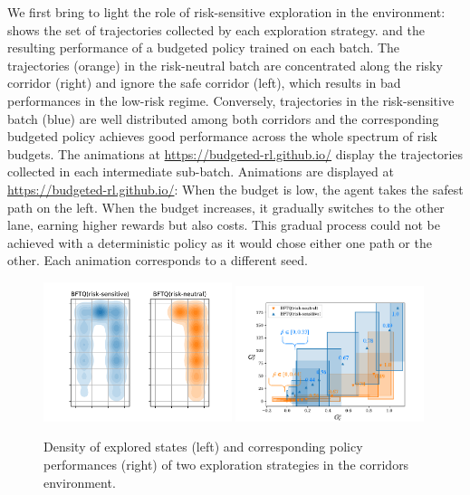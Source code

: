 We first bring to light the role of risk-sensitive exploration in the  environment:  shows the set of trajectories collected by each exploration strategy.
and the resulting performance of a budgeted policy trained on each batch. The trajectories (orange) in the risk-neutral batch are concentrated along the risky corridor (right) and ignore the safe corridor (left), which results in bad performances in the low-risk regime. Conversely, trajectories in the risk-sensitive batch (blue) are well distributed among both corridors and the corresponding budgeted policy achieves good performance across the whole spectrum of risk budgets. 
The animations at  \href{https://budgeted-rl.github.io/\#risk-sensitive-exploration}{https://budgeted-rl.github.io/} display the trajectories collected in each intermediate sub-batch.
Animations are displayed at  \href{https://budgeted-rl.github.io/\#optimal-budgeted-policies-learnt-with-a-risk-sensitive-exploration}{https://budgeted-rl.github.io/}: When the budget is low, the agent takes the safest path on the left. When the budget increases, it gradually switches to the other lane, earning higher rewards but also costs. This gradual process could not be achieved with a deterministic policy as it would chose either one path or the other. Each animation corresponds to a different seed.

\begin{figure}[tp]
	\centering
	\includegraphics[width=0.49\textwidth]{img/corridors_densities.pdf}
	\includegraphics[page=1, width=0.49\textwidth]{img/corridors}
	\caption{Density of explored states (left) and corresponding policy performances (right) of two exploration strategies in the {corridors} environment. }
	\label{fig:exploration}
\end{figure}


